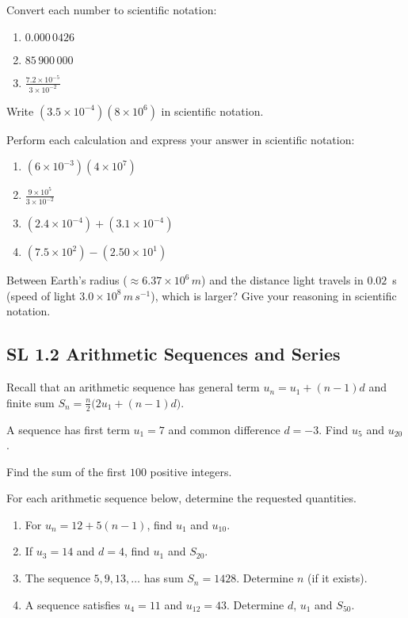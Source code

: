 \documentclass[11pt]{article}
\def\mathrm#1{#1}%
\newcommand{\tocsubsection}[1]{\subsection{#1}}
\newcounter{question}
\begin{document}
\begin{question}
Convert each number to scientific notation:
\begin{enumerate}[label=\alph*)]
\item $0.000\,0426$
\item $85\,900\,000$
\item $\displaystyle\frac{7.2\times 10^{-5}}{3\times 10^{-2}}$
\end{enumerate}
\end{question}

\begin{question}
Write $(3.5\times 10^{-4})(8\times 10^{6})$ in scientific notation.
\end{question}

\begin{question}
Perform each calculation and express your answer in scientific notation:
\begin{enumerate}[label=\alph*)]
\item $(6\times10^{-3})(4\times10^{7})$
\item $\displaystyle\frac{9\times10^{5}}{3\times10^{-2}}$
\item $(2.4\times10^{-4})+(3.1\times10^{-4})$
\item $(7.5\times10^{2})-(2.50\times10^{1})$
\end{enumerate}
\end{question}

\begin{question}
Between Earth's radius ($\approx 6.37\times10^{6}\,\mathrm{m}$) and the distance
light travels in $0.02$ s (speed of light $3.0\times10^{8}\,\mathrm{m\,s}^{-1}$),
which is larger?  Give your reasoning in scientific notation.
\end{question}

\tocsubsection{SL  1.2  \; Arithmetic  Sequences  and  Series}
Recall that an arithmetic sequence has general term $u_n=u_1+(n-1)d$ and
finite sum $S_n=\tfrac{n}{2}\bigl(2u_1+(n-1)d\bigr)$.

\begin{question}
A sequence has first term $u_1=7$ and common difference $d=-3$.  Find $u_5$ and
$u_{20}$.
\end{question}

\begin{question}
Find the sum of the first $100$ positive integers.
\end{question}

\begin{question}
For each arithmetic sequence below, determine the requested quantities.
\begin{enumerate}[label=\alph*)]
\item For $u_n=12+5(n-1)$, find $u_1$ and $u_{10}$.
\item If $u_3=14$ and $d=4$, find $u_1$ and $S_{20}$.
\item The sequence $5,9,13,\dots$ has sum $S_n=1428$.  Determine $n$ (if it exists).
\item A sequence satisfies $u_4=11$ and $u_{12}=43$.  Determine $d$, $u_1$ and
$S_{50}$.
\end{enumerate}
\end{question}
\end{document}
